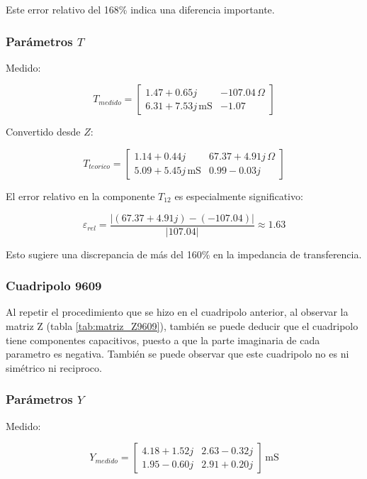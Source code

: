 Este error relativo del 168\% indica una diferencia importante.

\subsubsection*{Parámetros $T$}

Medido:


\[
T_{medido} =
\begin{bmatrix}
1.47 + 0.65j & -107.04\,\Omega \\
6.31 + 7.53j\,\mathrm{mS} & -1.07
\end{bmatrix}
\]



Convertido desde $Z$:


\[
T_{teorico} =
\begin{bmatrix}
1.14 + 0.44j & 67.37 + 4.91j\,\Omega \\
5.09 + 5.45j\,\mathrm{mS} & 0.99 - 0.03j
\end{bmatrix}
\]



El error relativo en la componente $T_{12}$ es especialmente significativo:



\[
\varepsilon_{rel} = \frac{|(67.37 + 4.91j) - (-107.04)|}{|107.04|} \approx 1.63
\]



Esto sugiere una discrepancia de más del 160\% en la impedancia de transferencia.

\subsubsection{Cuadripolo 9609}

Al repetir el procedimiento que se hizo en el cuadripolo anterior, al observar la matriz Z (tabla \ref{tab:matriz_Z9609}), también se puede deducir que el cuadripolo tiene componentes capacitivos, puesto a que la parte imaginaria de cada parametro es negativa. También se puede observar que este cuadripolo no es ni simétrico ni reciproco. 

\subsubsection*{Parámetros $Y$}

Medido:


\[
Y_{medido} =
\begin{bmatrix}
4.18 + 1.52j & 2.63 - 0.32j \\
1.95 - 0.60j & 2.91 + 0.20j
\end{bmatrix} \,\mathrm{mS}
\]



